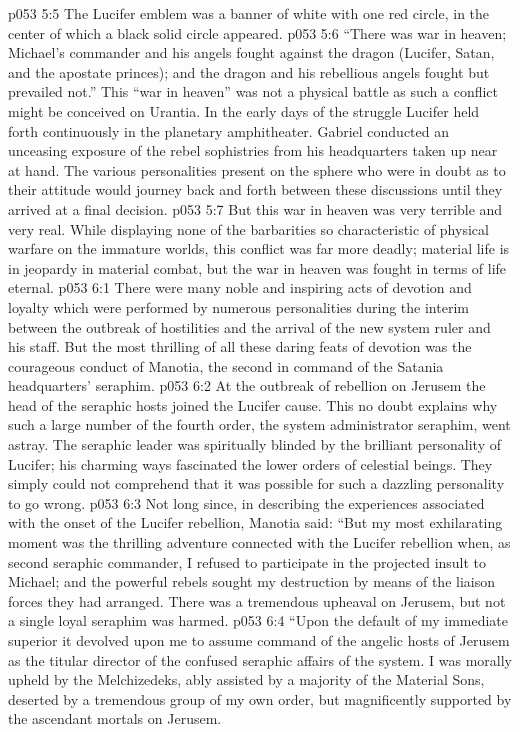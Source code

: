 \vs p053 5:5 The Lucifer emblem was a banner of white with one red circle, in the center of which a black solid circle appeared.
\vs p053 5:6 “There was war in heaven; Michael’s commander and his angels fought against the dragon (Lucifer, Satan, and the apostate princes); and the dragon and his rebellious angels fought but prevailed not.” This “war in heaven” was not a physical battle as such a conflict might be conceived on Urantia. In the early days of the struggle Lucifer held forth continuously in the planetary amphitheater. Gabriel conducted an unceasing exposure of the rebel sophistries from his headquarters taken up near at hand. The various personalities present on the sphere who were in doubt as to their attitude would journey back and forth between these discussions until they arrived at a final decision.
\vs p053 5:7 But this war in heaven was very terrible and very real. While displaying none of the barbarities so characteristic of physical warfare on the immature worlds, this conflict was far more deadly; material life is in jeopardy in material combat, but the war in heaven was fought in terms of life eternal.
\vs p053 6:1 There were many noble and inspiring acts of devotion and loyalty which were performed by numerous personalities during the interim between the outbreak of hostilities and the arrival of the new system ruler and his staff. But the most thrilling of all these daring feats of devotion was the courageous conduct of Manotia, the second in command of the Satania headquarters’ seraphim.
\vs p053 6:2 At the outbreak of rebellion on Jerusem the head of the seraphic hosts joined the Lucifer cause. This no doubt explains why such a large number of the fourth order, the system administrator seraphim, went astray. The seraphic leader was spiritually blinded by the brilliant personality of Lucifer; his charming ways fascinated the lower orders of celestial beings. They simply could not comprehend that it was possible for such a dazzling personality to go wrong.
\pc \vs p053 6:3 Not long since, in describing the experiences associated with the onset of the Lucifer rebellion, Manotia said: “But my most exhilarating moment was the thrilling adventure connected with the Lucifer rebellion when, as second seraphic commander, I refused to participate in the projected insult to Michael; and the powerful rebels sought my destruction by means of the liaison forces they had arranged. There was a tremendous upheaval on Jerusem, but not a single loyal seraphim was harmed.
\vs p053 6:4 “Upon the default of my immediate superior it devolved upon me to assume command of the angelic hosts of Jerusem as the titular director of the confused seraphic affairs of the system. I was morally upheld by the Melchizedeks, ably assisted by a majority of the Material Sons, deserted by a tremendous group of my own order, but magnificently supported by the ascendant mortals on Jerusem.
